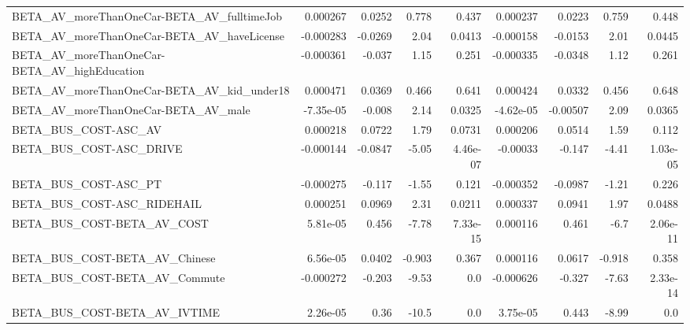 \begin{tabular}{lrrrrrrrr}
BETA\_AV\_moreThanOneCar-BETA\_AV\_fulltimeJob         &    0.000267 &       0.0252 &     0.778 &    0.437 &   0.000237 &      0.0223 &        0.759 &         0.448 \\
BETA\_AV\_moreThanOneCar-BETA\_AV\_haveLicense         &   -0.000283 &      -0.0269 &      2.04 &   0.0413 &  -0.000158 &     -0.0153 &         2.01 &        0.0445 \\
BETA\_AV\_moreThanOneCar-BETA\_AV\_highEducation       &   -0.000361 &       -0.037 &      1.15 &    0.251 &  -0.000335 &     -0.0348 &         1.12 &         0.261 \\
BETA\_AV\_moreThanOneCar-BETA\_AV\_kid\_under18         &    0.000471 &       0.0369 &     0.466 &    0.641 &   0.000424 &      0.0332 &        0.456 &         0.648 \\
BETA\_AV\_moreThanOneCar-BETA\_AV\_male                &   -7.35e-05 &       -0.008 &      2.14 &   0.0325 &  -4.62e-05 &    -0.00507 &         2.09 &        0.0365 \\
BETA\_BUS\_COST-ASC\_AV                               &    0.000218 &       0.0722 &      1.79 &   0.0731 &   0.000206 &      0.0514 &         1.59 &         0.112 \\
BETA\_BUS\_COST-ASC\_DRIVE                            &   -0.000144 &      -0.0847 &     -5.05 & 4.46e-07 &   -0.00033 &      -0.147 &        -4.41 &      1.03e-05 \\
BETA\_BUS\_COST-ASC\_PT                               &   -0.000275 &       -0.117 &     -1.55 &    0.121 &  -0.000352 &     -0.0987 &        -1.21 &         0.226 \\
BETA\_BUS\_COST-ASC\_RIDEHAIL                         &    0.000251 &       0.0969 &      2.31 &   0.0211 &   0.000337 &      0.0941 &         1.97 &        0.0488 \\
BETA\_BUS\_COST-BETA\_AV\_COST                         &    5.81e-05 &        0.456 &     -7.78 & 7.33e-15 &   0.000116 &       0.461 &         -6.7 &      2.06e-11 \\
BETA\_BUS\_COST-BETA\_AV\_Chinese                      &    6.56e-05 &       0.0402 &    -0.903 &    0.367 &   0.000116 &      0.0617 &       -0.918 &         0.358 \\
BETA\_BUS\_COST-BETA\_AV\_Commute                      &   -0.000272 &       -0.203 &     -9.53 &      0.0 &  -0.000626 &      -0.327 &        -7.63 &      2.33e-14 \\
BETA\_BUS\_COST-BETA\_AV\_IVTIME                       &    2.26e-05 &         0.36 &     -10.5 &      0.0 &   3.75e-05 &       0.443 &        -8.99 &           0.0 \\

\end{tabular}
